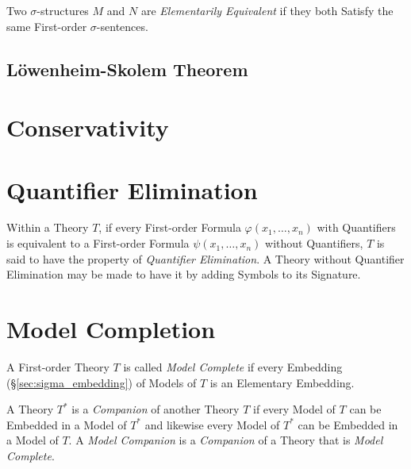 Two $\sigma$-structures $M$ and $N$ are \emph{Elementarily Equivalent}
if they both Satisfy the same First-order $\sigma$-sentences.



\subsection{L\"owenheim-Skolem Theorem}\label{sec:lowenheim_skolem}



\section{Conservativity}\label{sec:conservativity}



\section{Quantifier Elimination}

Within a Theory $T$, if every First-order Formula $\varphi(x_1,
\ldots, x_n)$ with Quantifiers is equivalent to a First-order Formula
$\psi(x_1, \ldots, x_n)$ without Quantifiers, $T$ is said to have the
property of \emph{Quantifier Elimination}. A Theory without Quantifier
Elimination may be made to have it by adding Symbols to its Signature.



\section{Model Completion}\label{sec:model_completion}

A First-order Theory $T$ is called \emph{Model Complete} if every
Embedding (\S\ref{sec:sigma_embedding}) of Models of $T$ is an
Elementary Embedding.

A Theory $T^*$ is a \emph{Companion} of another Theory $T$ if every
Model of $T$ can be Embedded in a Model of $T^*$ and likewise every
Model of $T^*$ can be Embedded in a Model of $T$. A \emph{Model
  Companion} is a \emph{Companion} of a Theory that is \emph{Model
  Complete}.

